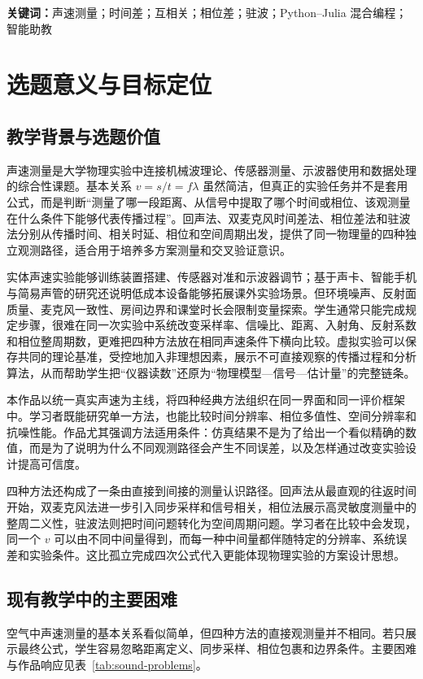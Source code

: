 \documentclass[UTF8,a4paper,zihao=-4]{ctexart}
\begin{document}
\noindent\textbf{关键词：}声速测量；时间差；互相关；相位差；驻波；Python--Julia 混合编程；智能助教

\clearpage
\tableofcontents
\clearpage
{}

\section{选题意义与目标定位}

\subsection{教学背景与选题价值}
声速测量是大学物理实验中连接机械波理论、传感器测量、示波器使用和数据处理的综合性课题\cite{rayleigh1877,morse1948,crawford1968}。基本关系 $v=s/t=f\lambda$ 虽然简洁，但真正的实验任务并不是套用公式，而是判断“测量了哪一段距离、从信号中提取了哪个时间或相位、该观测量在什么条件下能够代表传播过程”。回声法、双麦克风时间差法、相位差法和驻波法分别从传播时间、相关时延、相位和空间周期出发，提供了同一物理量的四种独立观测路径\cite{berg2011,carvalho2007,water2020,standing2024}，适合用于培养多方案测量和交叉验证意识。

实体声速实验能够训练装置搭建、传感器对准和示波器调节；基于声卡、智能手机与简易声管的研究还说明低成本设备能够拓展课外实验场景\cite{carvalho2007,staacks2018,hellesund2018}。但环境噪声、反射面质量、麦克风一致性、房间边界和课堂时长会限制变量探索。学生通常只能完成规定步骤，很难在同一次实验中系统改变采样率、信噪比、距离、入射角、反射系数和相位整周期数，更难把四种方法放在相同声速条件下横向比较。虚拟实验可以保存共同的理论基准，受控地加入非理想因素，展示不可直接观察的传播过程和分析算法，从而帮助学生把“仪器读数”还原为“物理模型—信号—估计量”的完整链条。

本作品以统一真实声速为主线，将四种经典方法组织在同一界面和同一评价框架中。学习者既能研究单一方法，也能比较时间分辨率、相位多值性、空间分辨率和抗噪性能。作品尤其强调方法适用条件：仿真结果不是为了给出一个看似精确的数值，而是为了说明为什么不同观测路径会产生不同误差，以及怎样通过改变实验设计提高可信度。

四种方法还构成了一条由直接到间接的测量认识路径。回声法从最直观的往返时间开始，双麦克风法进一步引入同步采样和信号相关，相位法展示高灵敏度测量中的整周二义性，驻波法则把时间问题转化为空间周期问题。学习者在比较中会发现，同一个 $v$ 可以由不同中间量得到，而每一种中间量都伴随特定的分辨率、系统误差和实验条件。这比孤立完成四次公式代入更能体现物理实验的方案设计思想。

\subsection{现有教学中的主要困难}
空气中声速测量的基本关系看似简单，但四种方法的直接观测量并不相同。若只展示最终公式，学生容易忽略距离定义、同步采样、相位包裹和边界条件。主要困难与作品响应见表~\ref{tab:sound-problems}。
\end{document}
